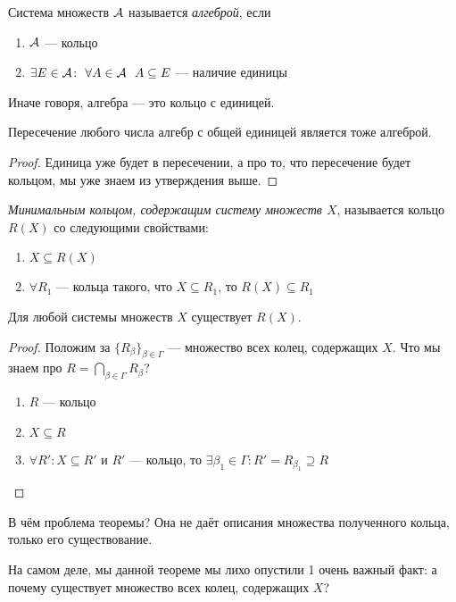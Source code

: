 \begin{definition}
	Система множеств $\mathcal{A}$ называется \textit{алгеброй}, если
	\begin{enumerate}
		\item $\mathcal{A}$ --- кольцо
		
		\item $\exists E \in \mathcal{A} \colon\ \forall A \in \mathcal{A}\ \ A \subseteq E$ --- наличие единицы
	\end{enumerate}
	Иначе говоря, алгебра --- это кольцо с единицей.
\end{definition}

\begin{proposition}
	Пересечение любого числа алгебр с общей единицей является тоже алгеброй.
\end{proposition}

\begin{proof}
	Единица уже будет в пересечении, а про то, что пересечение будет кольцом, мы уже знаем из утверждения выше.
\end{proof}

\begin{definition}
	\textit{Минимальным кольцом, содержащим систему множеств $X$}, называется кольцо $R(X)$ со следующими свойствами:
	\begin{enumerate}
		\item $X \subseteq R(X)$
		
		\item $\forall R_1$ --- кольца такого, что $X \subseteq R_1$, то $R(X) \subseteq R_1$
	\end{enumerate}
\end{definition}

\begin{theorem}
	Для любой системы множеств $X$ существует $R(X)$.
\end{theorem}

\begin{proof}
	Положим за $\{R_\beta\}_{\beta \in \Gamma}$ --- множество всех колец, содержащих $X$. Что мы знаем про $R = \bigcap_{\beta \in \Gamma} R_\beta$?
	\begin{enumerate}
		\item $R$ --- кольцо
		
		\item $X \subseteq R$
		
		\item $\forall R' \colon X \subseteq R'$ и $R'$ --- кольцо, то $\exists \beta_1 \in \Gamma \colon R' = R_{\beta_1} \supseteq R$
	\end{enumerate}
\end{proof}

\begin{note}
	В чём проблема теоремы? Она не даёт описания множества полученного кольца, только его существование.
\end{note}

\begin{anote}
	На самом деле, мы данной теореме мы лихо опустили 1 очень важный факт: а почему существует множество всех колец, содержащих $X$?
\end{anote}